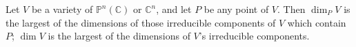 Let $V$ be a variety of $\mathbb{P}^n(\mathbb{C})$ or $\mathbb{C}^n$, and let $P$ be any point of $V$. Then $\dim_P V$ is the largest of the dimensions of those irreducible components of $V$ which contain $P$; $\dim V$ is the largest of the dimensions of $V$'s irreducible components.
